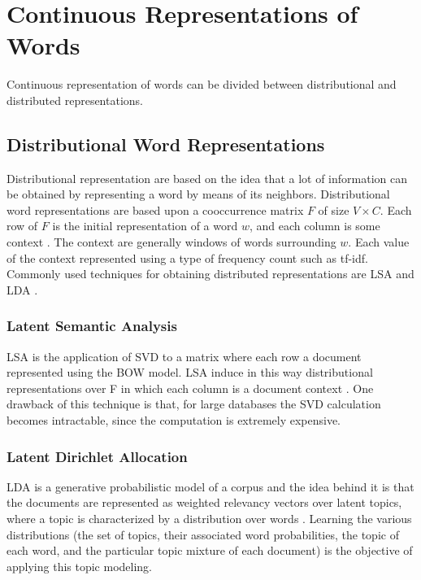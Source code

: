  \section{Continuous Representations of Words}

\label{sec:sub_continuous_representation}
 Continuous representation  of words  can be divided between distributional and
 distributed representations. 

\subsection{Distributional Word Representations}

Distributional representation are based on the idea that a lot of
information can be obtained by representing a word by means of its neighbors.
Distributional word representations are based 
upon a cooccurrence matrix $F$ of size $V \times C$.  Each row of $F$ is the
initial representation of a word $w$, and each column is some context
\cite{Turian:2010:WRS:1858681.1858721}. The context  are generally windows of
 words surrounding $w$. Each value of the context  represented using a type of
frequency count such as \ac{tf-idf}. Commonly used techniques for obtaining distributed
representations  are \ac{LSA} \cite{Dumais:1988:ULS:57167.57214} and \ac{LDA}
\cite{Blei:2003:LDA:944919.944937}.


 \subsubsection{Latent Semantic Analysis}
 \label{sec:rel_sa}
\ac{LSA} is the application of \ac{SVD} to a matrix where each row a document
represented using the \ac{BOW} model.
 \ac{LSA} induce in this way  distributional representations over F in which
each column is a document context \cite{Turian:2010:WRS:1858681.1858721}.  
One drawback of this technique is that,  for large databases the SVD
calculation becomes intractable, since the computation is extremely
expensive.

 \subsubsection{Latent Dirichlet Allocation}
 \label{sec:rel_lda}
\ac{LDA} is a generative probabilistic model of a corpus and the
idea behind it is that the documents are represented as weighted relevancy
vectors over latent topics, where a topic is characterized by a distribution over
words \cite{Blei:2003:LDA:944919.944937}.
Learning the various distributions (the set of topics, their associated word
probabilities, the topic of each word, and the particular topic mixture of
each document) is the objective of applying this topic modeling.

